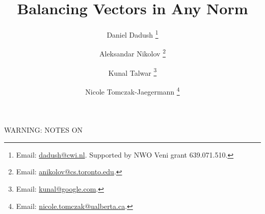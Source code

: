 \documentclass[11pt]{article}
\newcommand{\noteswarning}{{\begin{center} {\Large WARNING: NOTES ON}\end{center}}}
\newcommand{\noteswarning}{{}}
\begin{document}
\title{Balancing Vectors in Any Norm}
\author[1]{Daniel Dadush
\thanks{Email: \href{mailto:dadush@cwi.nl}{dadush@cwi.nl}.
Supported by NWO Veni grant 639.071.510.}} 
\author[2]{ 
Aleksandar Nikolov
\thanks{Email: \href{mailto:anikolov@cs.toronto.edu}{anikolov@cs.toronto.edu}.}}
\author[3]{
Kunal Talwar
\thanks{Email: \href{mailto:kunal@google.com}{kunal@google.com}.}} 
\author[4]{
Nicole Tomczak-Jaegermann
\thanks{Email: 
\href{mailto:nicole.tomczak@ualberta.ca}{nicole.tomczak@ualberta.ca}.}} 


\maketitle

\noteswarning
\end{document}
